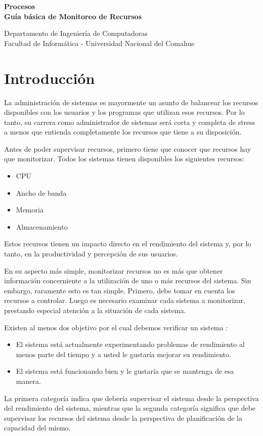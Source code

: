 \documentclass[12pt]{article}
\def\maketitle{

 \makeatletter
 {\color{bl} \centering \huge \sc \textbf{
 Procesos \\ 
\large \vspace*{-8pt} \color{black} Guía básica de Monitoreo de Recursos 
 \vspace*{8pt} }\par}
 \makeatother


 \makeatletter
 {\centering \small 
 	Departamento de Ingeniería de Computadoras \\
 	Facultad de Informática - Universidad Nacional del Comahue \\
 	\vspace{20pt} }
 \makeatother

}
\begin{document}
\thispagestyle{empty}
\maketitle
\setlength{\parindent}{0pt}

\section*{Introducción}

La administración de sistemas es mayormente un asunto de balancear los recursos disponibles con 
los usuarios y los programas que utilizan esos recursos. Por lo tanto, su carrera como administrador de sistemas será corta y completa de stress a menos que entienda completamente los recursos que tiene a su disposición.

Antes de poder supervisar recursos, primero tiene que conocer que recursos hay que monitorizar.
Todos los sistemas tienen disponibles los siguientes recursos:

\begin{itemize}
\item CPU

\item Ancho de banda

\item Memoria

\item Almacenamiento
\end{itemize}

Estos recursos tienen un impacto directo en el rendimiento del sistema y, por lo tanto, en la productividad y percepción de sus usuarios.

En su aspecto más simple, monitorizar recursos no es más que obtener información concerniente a la utilización de uno o más recursos del sistema. Sin embargo, raramente esto es tan simple. Primero, debe tomar en cuenta los recursos a controlar. Luego es necesario examinar cada sistema a monitorizar, prestando especial atención a la situación de cada sistema.

Existen al menos dos objetivo por el cual debemos verificar un sistema :

\begin{itemize}
\item El sistema está actualmente experimentando problemas de rendimiento al menos parte del tiempo y a usted le gustaría mejorar su rendimiento.

\item El sistema está funcionando bien y le gustaría que se mantenga de esa manera.
\end{itemize}
La primera categoría indica que debería supervisar el sistema desde la perspectiva del rendimiento del sistema, mientras que la segunda categoría significa que debe supervisar los recursos del sistema desde la perspectiva de planificación de la capacidad del mismo.
\end{document}
